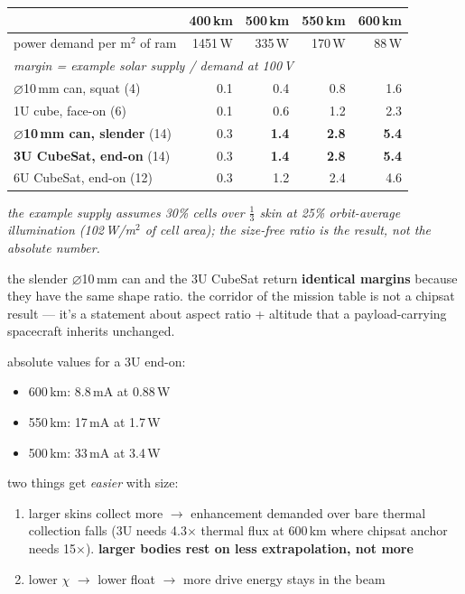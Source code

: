 \documentclass[11pt]{article}
\begin{document}
\begin{center}\small
\begin{tabular}{lrrrr}
\toprule
 & 400\,km & 500\,km & 550\,km & 600\,km \\
\midrule
power demand per m$^2$ of ram & 1451\,W & 335\,W & 170\,W & 88\,W \\
\midrule
\multicolumn{5}{l}{\emph{margin = example solar supply / demand at 100\,V}} \\
$\varnothing$10\,mm can, squat \hfill (4) & 0.1 & 0.4 & 0.8 & 1.6 \\
1U cube, face-on \hfill (6) & 0.1 & 0.6 & 1.2 & 2.3 \\
\textbf{$\varnothing$10\,mm can, slender} \hfill (14) & 0.3 & \textbf{1.4} &
  \textbf{2.8} & \textbf{5.4} \\
\textbf{3U CubeSat, end-on} \hfill (14) & 0.3 & \textbf{1.4} & \textbf{2.8} &
  \textbf{5.4} \\
6U CubeSat, end-on \hfill (12) & 0.3 & 1.2 & 2.4 & 4.6 \\
\bottomrule
\end{tabular}
\end{center}
{\small\itshape the example supply assumes 30\% cells over $\frac{1}{3}$ skin
at 25\% orbit-average illumination (102\,W/m$^2$ of cell area); the
size-free ratio is the result, not the absolute number.}

\medskip
the slender $\varnothing$10\,mm can and the 3U CubeSat return
\textbf{identical margins} because they have the same shape ratio.  the
corridor of the mission table is not a chipsat result --- it's a statement
about aspect ratio + altitude that a payload-carrying spacecraft inherits
unchanged.

\medskip
absolute values for a 3U end-on:
\begin{itemize}
  \item 600\,km: 8.8\,mA at 0.88\,W
  \item 550\,km: 17\,mA at 1.7\,W
  \item 500\,km: 33\,mA at 3.4\,W
\end{itemize}

two things get \emph{easier} with size:
\begin{enumerate}
  \item larger skins collect more $\to$ enhancement demanded over bare thermal
        collection falls (3U needs 4.3$\times$ thermal flux at 600\,km where
        chipsat anchor needs 15$\times$).  \textbf{larger bodies rest on less
        extrapolation, not more}
  \item lower $\chi$ $\to$ lower float $\to$ more drive energy stays in the
        beam
\end{enumerate}
\end{document}

